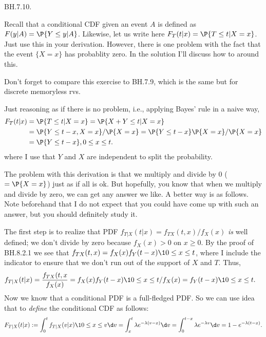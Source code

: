 \begin{exercise} BH.7.10.

Recall that a conditional CDF given an event $A$ is defined as $F(y|A) = \P{Y\leq y|A}$. Likewise, let us write here $F_T(t|x) = \P{T\leq t|X=x}$.
Just use this in your derivation. However, there is one problem with the fact that the event $\{X=x\}$ has probablity zero. In the solution I'll discuss how to around this.

Don't forget to compare  this exercise to BH.7.9, which is the same but for discrete memoryless rvs.

\begin{solution}
Just reasoning as if there is no problem, i.e., applying Bayes' rule in a  naive way,
\begin{align*}
F_T(t|x) &= \P{T\leq t|X=x} = \P{X+Y\leq t|X=x} \\
  &=\P{Y\leq t-x, X=x}/\P{X=x} = \P{Y\leq t-x}\P{X=x}/\P{X=x}\\
  &=\P{Y\leq t-x}, 0\leq x \leq t.
\end{align*}
where I use that $Y$ and $X$ are independent to split the probability.

The problem with this derivation is that we multiply and divide by 0 ($=\P{X=x}$) just as if all is ok. But hopefully, you know that when we multiply and divide by zero, we can get any answer we like. A better way is as follows. Note beforehand that I do not expect that you could have  come up with such an answer, but you should definitely study it.


The first step is to realize that PDF $f_{T|X}(t|x)=f_{TX}(t,x)/f_X(x)$ \emph{is} well defined; we don't divide by zero because $f_{X}(x)>0$ on $x\geq 0$. By the proof of BH.8.2.1 we see that $f_{TX}(t,x) = f_X(x)f_Y(t-x) \1{0 \leq x \leq t}$, where I include the indicator to ensure that we don't run out of the support of $X$ and $T$. Thus,
\begin{align*}
  f_{T|X}(t|x) &= \frac{f_{TX}(t,x}{f_{X}(x)} = f_X(x)f_Y(t-x) \1{0 \leq x \leq t}/f_X(x) = f_Y(t-x)\1{0\leq x \leq t}.
\end{align*}
Now we know that a conditional PDF is a full-fledged PDF. So we can use idea that to \emph{define} the conditional CDF as follows:
\begin{align*}
F_{T|X}(t|x)
  := \int_0^t f_{T|X}(v|x)\1{0\leq x \leq v} \d v
    = \int_x^t \lambda e^{-\lambda(v-x)} \d v
    = \int_0^{t-x} \lambda e^{-\lambda v} \d v = 1- e^{-\lambda(t-x)}.
\end{align*}


\end{solution}
\end{exercise}
